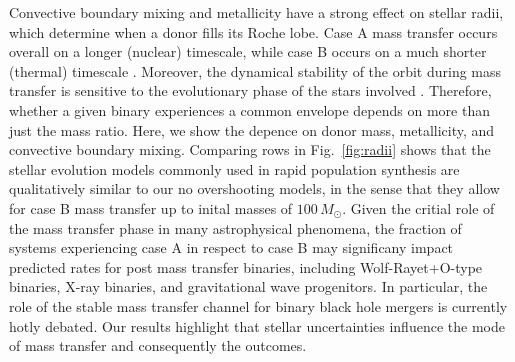 \documentclass[twocolumn]{aastex63}
\begin{document}
Convective boundary mixing \cite{brott:11, johnston:24} and
metallicity have a strong effect on stellar radii, which determine
when a donor fills its Roche lobe. Case A mass transfer occurs overall
on a longer (nuclear) timescale, while case B occurs on a much shorter
(thermal) timescale \citep[but see][]{klencki:22}. Moreover, the
dynamical stability of the orbit during mass transfer is sensitive to the evolutionary phase of the stars involved
\citep[e.g.,][]{claeys:14}. Therefore, whether a given binary
experiences a common envelope depends on more than just the mass
ratio. Here, we show the depence on donor mass, metallicity, and
convective boundary mixing. Comparing rows in Fig.~\ref{fig:radii}
shows that the stellar evolution models commonly used in rapid
population synthesis are qualitatively similar to our no overshooting
models, in the sense that they allow for case B mass transfer up to
inital masses of $100 \, M_{\odot}$. Given the critial role of the
mass transfer phase in many astrophysical phenomena, the fraction of
systems experiencing case A in respect to case B may significany
impact predicted rates for post mass transfer binaries, including
Wolf-Rayet+O-type binaries, X-ray binaries, and gravitational wave
progenitors. In particular, the role of the stable mass transfer
channel \citep[e.g.,][]{marchant:21, vanson:21} for binary black hole
mergers is currently hotly debated. Our results highlight that stellar
uncertainties influence the mode of mass transfer and consequently the
outcomes.



\end{document}
